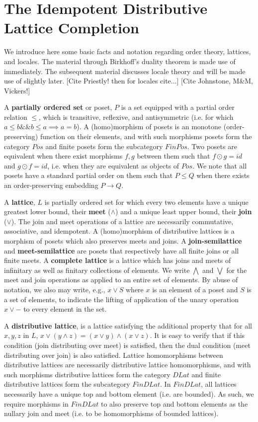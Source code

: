 \documentclass[hoptionsi,review,format=sigplan]{acmart}
\theoremstyle{definition}
\begin{document}
\section{The Idempotent Distributive Lattice Completion}

We introduce here some basic facts and notation regarding order theory, lattices, and locales. The material through Birkhoff's duality theorem is made use of immediately. The subsequent material discusses locale theory and will be made use of slightly later. [Cite Priestly! then for locales cite...]  [Cite Johnstone, M\&M, Vickers!]

A \textbf{partially ordered set} or poset, \(P\) is a set equipped with a partial order relation \(\le\), which is transitive,  reflexive, and antisymmetric (i.e. for which \( a \le b \mathbin{\&\&} b \le a \implies a = b\)). A (homo)morphism of posets is an monotone (order-preserving) function on their elements, and with such morphisms posets form the category \(Pos\) and finite posets form the subcategory \(FinPos\). Two posets are equivalent when there exist morphisms \(f, g\) between them such that \(f \odot g = id\) and \(g \odot f = id\), i.e. when they are equivalent as objects of \(Pos\). We note that all posets have a standard partial order on them such that \(P \le Q\) when there exists an order-preserving embedding \(P \rightarrow Q\).

A \textbf{lattice}, \(L\) is partially ordered set for which every two elements have a unique greatest lower bound, their \textbf{meet} (\(\wedge\)) and a unique least upper bound, their \textbf{join} (\(\vee\)). The join and meet operations of a lattice are necessarily commutative, associative, and idempotent. A (homo)morphism of distributive lattices is a morphism of posets which also preserves meets and joins. A \textbf{join-semilattice} and \textbf{meet-semilattice} are posets that respectively have all finite joins or all finite meets. A \textbf{complete lattice} is a lattice which has joins and meets of infinitary as well as finitary collections of elements. We write \(\bigwedge\) and \(\bigvee\) for the meet and join operations as applied to an entire set of elements. By abuse of notation, we also may write, e.g., \(x \vee S\) where \(x\) is an element of a poset and \(S\) is a set of elements, to indicate the lifting of application of the unary operation \(x \vee -\) to every element in the set.

A \textbf{distributive lattice}, is a lattice satisfying the additional property that for all \(x, y, z\) in \(L\), \(x \vee (y \wedge z) = (x \vee y) \wedge (x \vee z)\). It is easy to verify that if this condition (join distributing over meet) is satisfied, then the dual condition (meet distributing over join) is also satisfied.  Lattice homomorphisms between distributive lattices are necessarily distributive lattice homomorphisms, and with such morphisms distributive lattices form the category \(DLat\) and finite distributive lattices form the subcategory \(FinDLat\). In \(FinDLat\), all lattices necessarily have a unique top and bottom element (i.e. are bounded). As such, we require morphisms in \(FinDLat\) to also preserve top and bottom elements as the nullary join and meet (i.e. to be homomorphisms of bounded lattices).
\end{document}
